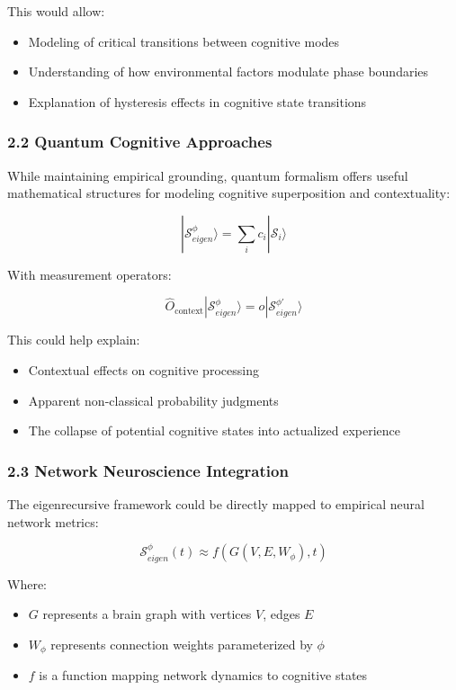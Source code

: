 \documentclass[
]{article}
\providecommand{\tightlist}{%
  \setlength{\itemsep}{0pt}\setlength{\parskip}{0pt}}
\begin{document}
This would allow:

\begin{itemize}
\tightlist
\item
  Modeling of critical transitions between cognitive modes
\item
  Understanding of how environmental factors modulate phase boundaries
\item
  Explanation of hysteresis effects in cognitive state transitions
\end{itemize}

\subsubsection{2.2 Quantum Cognitive
Approaches}\label{quantum-cognitive-approaches}

While maintaining empirical grounding, quantum formalism offers useful
mathematical structures for modeling cognitive superposition and
contextuality:

\[|\mathcal{S}_{eigen}^{\phi}\rangle = \sum_i c_i |\mathcal{S}_i\rangle\]

With measurement operators:

\[\hat{O}_{\text{context}} |\mathcal{S}_{eigen}^{\phi}\rangle = o |\mathcal{S}_{eigen}^{\phi'}\rangle\]

This could help explain:

\begin{itemize}
\tightlist
\item
  Contextual effects on cognitive processing
\item
  Apparent non-classical probability judgments
\item
  The collapse of potential cognitive states into actualized experience
\end{itemize}

\subsubsection{2.3 Network Neuroscience
Integration}\label{network-neuroscience-integration}

The eigenrecursive framework could be directly mapped to empirical
neural network metrics:

\[\mathcal{S}_{eigen}^{\phi}(t) \approx f(G(V,E,W_{\phi}), t)\]

Where:

\begin{itemize}
\tightlist
\item
  \(G\) represents a brain graph with vertices \(V\), edges \(E\)
\item
  \(W_{\phi}\) represents connection weights parameterized by \(\phi\)
\item
  \(f\) is a function mapping network dynamics to cognitive states
\end{itemize}
\end{document}
